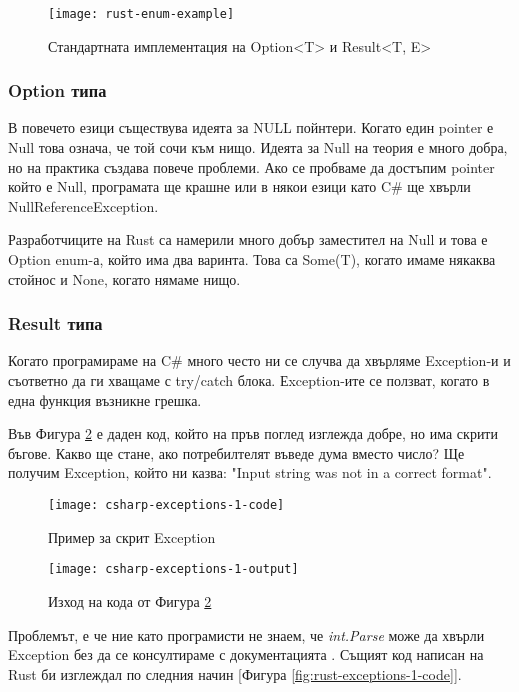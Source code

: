 \begin{figure}[!htb]
  \texttt{[image: rust-enum-example]}
  \centering
  \caption{Стандартната имплементация на Option<T> и Result<T, E>}
  \label{fig:rust-enum-example}
\end{figure}

\subsubsection{Option типа}
В повечето езици съществува идеята за NULL пойнтери. Когато един pointer е Null
това означа, че той сочи към нищо. Идеята за Null на теория е много добра, но
на практика създава повече проблеми. Ако се пробваме да достъпим pointer който
е Null, програмата ще крашне или в някои езици като C\# ще хвърли
NullReferenceException.

Разработчиците на Rust са намерили много добър заместител на Null и това е
Option enum-а, който има два варинта. Това са Some(T), когато имаме някаква
стойнос и None, когато нямаме нищо.

\subsubsection{Result типа}
Когато програмираме на C\# много често ни се случва да хвърляме Exception-и и
съответно да ги хващаме с try/catch блока. Еxception-ите се ползват, когато в
една функция възникне грешка.

Във Фигура \ref{fig:csharp-exceptions-1-code} е даден код, който на пръв поглед
изглежда добре, но има скрити бъгове. Какво ще стане, ако потребилтелят въведе
дума вместо число? Ще получим Exception, който ни казва: "Input string was not
in a correct format".
\begin{figure}[!htb]
  \texttt{[image: csharp-exceptions-1-code]}
  \centering
  \caption{Пример за скрит Exception}
  \label{fig:csharp-exceptions-1-code}
\end{figure}


\begin{figure}[!htb]
  \texttt{[image: csharp-exceptions-1-output]}
  \centering
  \caption{Изход на кода от Фигура \ref{fig:csharp-exceptions-1-code}}
  \label{fig:csharp-exceptions-1-output}
\end{figure}

Проблемът, е че ние като програмисти не знаем, че \textit{int.Parse} може да хвърли
Exception без да се консултираме с документацията \cite{CSharp_Int_Parse}.
Същият код написан на Rust би изглеждал по следния начин [Фигура \ref{fig:rust-exceptions-1-code}].

